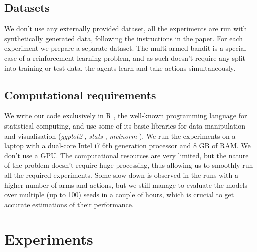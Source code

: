 \subsection{Datasets}

We don't use any externally provided dataset, all the experiments are run with synthetically generated data, following the instructions in the paper. For each experiment we prepare a separate dataset. The multi-armed bandit is a special case of a reinforcement learning problem, and as such doesn't require any split into training or test data, the agents learn and take actions simultaneously.

\subsection{Computational requirements}

We write our code exclusively in R \cite{r}, the well-known programming language for statistical computing, and use some of its basic libraries for data manipulation and visualisation (\emph{ggplot2} \cite{ggplot2}, \emph{stats} \cite{r}, \emph{mvtnorm} \cite{mvtnorm}). We run the experiments on a laptop with a dual-core Intel i7 6th generation processor and 8 GB of RAM. We don't use a GPU. The computational resources are very limited, but the nature of the problem doesn't require huge processing, thus allowing us to smoothly run all the required experiments. Some slow down is observed in the runs with a higher number of arms and actions, but we still manage to evaluate the models over multiple (up to 100) seeds in a couple of hours, which is crucial to get accurate estimations of their performance.

\section{Experiments}
\label{sec:experiments}

